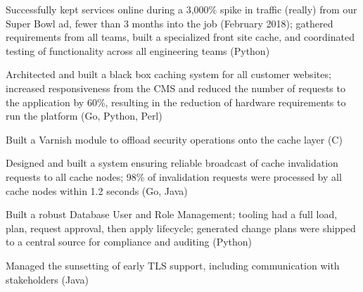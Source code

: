 %
\item Successfully kept services online during a 3,000\% spike in traffic (really) from our Super Bowl ad, fewer than 3
  months into the job (February 2018); gathered requirements from all teams, built a specialized front site cache, and
  coordinated testing of functionality across all engineering teams (Python)

\item Architected and built a black box caching system for all customer websites; increased responsiveness from the CMS
  and reduced the number of requests to the application by 60\%, resulting in the reduction of hardware requirements to
  run the platform (Go, Python, Perl)

\item Built a Varnish module to offload security operations onto the cache layer (C)

\item Designed and built a system ensuring reliable broadcast of cache invalidation requests to all cache nodes; 98\% of
  invalidation requests were processed by all cache nodes within 1.2 seconds (Go, Java)

\item Built a robust Database User and Role Management; tooling had a full load, plan, request approval, then apply
  lifecycle; generated change plans were shipped to a central source for compliance and auditing (Python)

\item Managed the sunsetting of early TLS support, including communication with stakeholders (Java)
